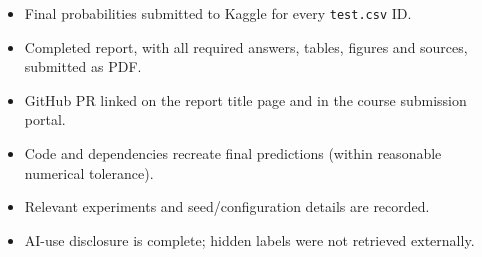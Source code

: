 \documentclass[11pt,letterpaper]{article}
\begin{document}
\begin{itemize}[leftmargin=*,label=$\square$,itemsep=4pt]
    \item Final probabilities submitted to Kaggle for every \texttt{test.csv} ID.
    \item Completed report, with all required answers, tables, figures and sources, submitted as PDF.
    \item GitHub PR linked on the report title page and in the course submission portal.
    \item Code and dependencies recreate final predictions (within reasonable numerical tolerance).
    \item Relevant experiments and seed/configuration details are recorded.
    \item AI-use disclosure is complete; hidden labels were not retrieved externally.
\end{itemize}
\end{document}
